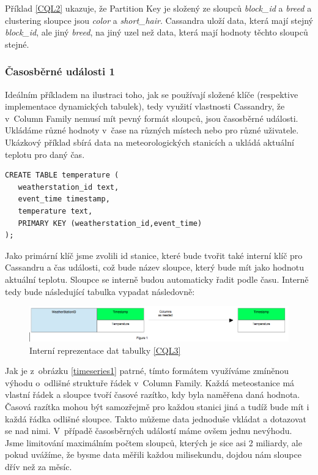 Příklad \ref{CQL2} ukazuje, že Partition Key je složený ze sloupců \emph{block\_id} a  \emph{breed} a clustering sloupce jsou \emph{color} a \emph{short\_hair}. Cassandra uloží data, která mají stejný \emph{block\_id}, ale jiný \emph{breed}, na jiný uzel než data, která mají hodnoty těchto sloupců stejné.  


\subsubsection*{Časosběrné události 1}
Ideálním příkladem na ilustraci toho, jak se používají složené klíče (respektive implementace dynamických tabulek), tedy využití vlastnosti Cassandry, že v~Column Family nemusí mít pevný formát sloupců, jsou časosběrné události. Ukládáme různé hodnoty v~čase na různých místech nebo pro různé uživatele. Ukázkový příklad sbírá data na meteorologických stanicích a ukládá aktuální teplotu pro daný čas.

\begin{lstlisting}[caption={Dynamická tabulka 1},label=CQL3]
CREATE TABLE temperature (
   weatherstation_id text,
   event_time timestamp,
   temperature text,
   PRIMARY KEY (weatherstation_id,event_time)
);
\end{lstlisting}

Jako primární klíč jsme zvolili id stanice, které bude tvořit také interní klíč pro Cassandru a čas události, což bude název sloupce, který bude mít jako hodnotu aktuální teplotu. Sloupce se interně budou automaticky řadit podle času. Interně tedy bude následující tabulka vypadat následovně: 

\begin{figure}[h]
\centering
\includegraphics[scale=0.4]{images/timeseries1}
\caption{Interní reprezentace dat tabulky \ref{CQL3}}
\label{fig:timeseries1}
\end{figure}

Jak je z~obrázku \ref{timeseries1} patrné, tímto formátem využíváme zmíněnou výhodu o~odlišné struktuře řádek v~Column Family. Každá meteostanice má vlastní řádek a sloupce tvoří časové razítko, kdy byla naměřena daná hodnota. Časová razítka mohou být samozřejmě pro každou stanici jiná a tudíž bude mít i každá řádka odlišné sloupce. Takto můžeme data jednoduše vkládat a dotazovat se nad nimi. V~případě časosběrných událostí máme ovšem jednu nevýhodu. Jsme limitování maximálním počtem sloupců, kterých je sice asi 2 miliardy, ale pokud uvážíme, že bysme data měřili každou milisekundu, dojdou nám sloupce dřív než za měsíc.  

